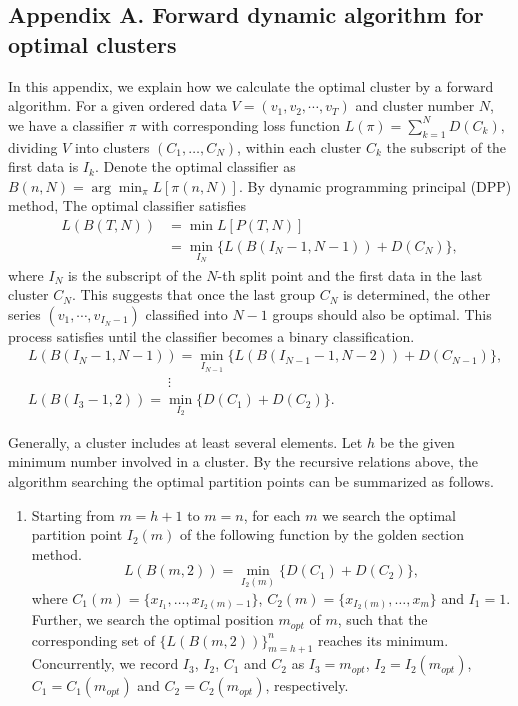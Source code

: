 \documentclass[preprint,12pt,authoryear]{elsarticle}
\begin{document}
\begin{appendix}

\section*{Appendix A. Forward dynamic algorithm for optimal clusters}\label{apx:algorithm}

In this appendix, we explain how we calculate the optimal cluster by a forward algorithm. For a given ordered data $V=\left(v_1,v_2,\cdots,v_T\right)$ and cluster number $N$, we have a classifier $\pi$ with corresponding loss function $L(\pi)=\sum_{k=1}^{N}D(C_{k}),$ dividing $V$ into clusters $(C_1,\dots,C_N)$, within each cluster $C_k$ the subscript of the first data is $I_k.$
Denote the optimal classifier as $B(n,N)=\arg \min_\pi L[\pi(n,N)]$.
By dynamic programming principal (DPP) method, The optimal classifier satisfies
\begin{align*}L(B( T,N )) & =\min L[P(T,N)]\\&= \min_{I_N} \{L( B ( I_N-1,N-1 ))
+D(C_N)\}, \end{align*}
where $I_N$ is the subscript of the $N$-th split point and the first data in the last cluster $C_N$. This suggests that once the last group $C_N$ is determined, the other series $\left(v_1,\cdots,v_{I_N-1}\right)$ classified into $N-1$ groups should also be optimal. This process satisfies until the classifier becomes a binary classification.
\begin{align*}
&L( B( I_N-1,N-1 )) = \min_{I_{N-1}} \{ L( B ( I_{N-1}-1,N-2 ))+D(C_{N-1}) \},\\
& \qquad \qquad \qquad \qquad \qquad \vdots \\
&L( B( I_{3}-1,2 )) = \min_{I_2} \{ D(C_{1})+D(C_{2}) \}.
\end{align*}

Generally, a cluster includes at least several elements. Let $h$ be the given minimum number involved in a cluster. By the recursive relations above, the algorithm searching the optimal partition points can be summarized as follows.

\begin{enumerate}[Step 1.]
 \item Starting from $m=h+1$ to $m=n$, for each $m$ we search the optimal partition point $I_2(m)$ of the following function by the golden section method. $$L(B( m,2 ))  =\min_{I_2(m)} \{ D(C_1)+D(C_2) \},$$ where $C_1(m)=\{ x_{I_1},\dots,x_{I_2(m)-1} \}$, $C_2(m) = \{ x_{I_2(m)},\dots,x_{m} \}$ and $I_1=1$. Further, we search the optimal position $m_{opt}$ of $m$, such that the corresponding set of $\{L(B( m,2 ))\}_{m=h+1}^n$ reaches its minimum.
 Concurrently, we record $I_3$, $I_2$, $C_1$ and $C_2$ as $I_3 = m_{opt}$, $I_2 = I_2(m_{opt})$, $C_1 = C_1(m_{opt})$ and $C_2= C_2(m_{opt})$, respectively.


\end{enumerate}
\end{appendix}
\end{document}
